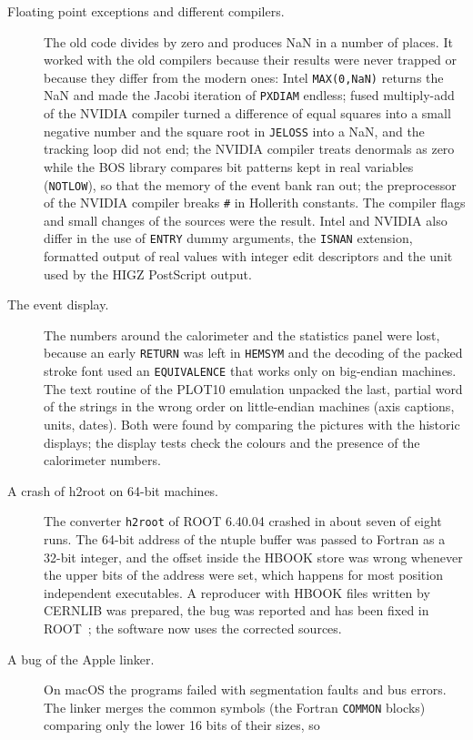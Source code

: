 \begin{description}
\item[Floating point exceptions and different compilers.] The old code divides by zero and produces NaN in a
number of places. It worked with the old compilers because their results were never trapped or because they
differ from the modern ones: Intel \texttt{MAX(0,NaN)} returns the NaN and made the Jacobi iteration of
\texttt{PXDIAM} endless; fused multiply-add of the NVIDIA compiler turned a difference of equal squares into a
small negative number and the square root in \texttt{JELOSS} into a NaN, and the tracking loop did not end; the
NVIDIA compiler treats denormals as zero while the BOS library compares bit patterns kept in real variables
(\texttt{NOTLOW}), so that the memory of the event bank ran out; the preprocessor of the NVIDIA compiler
breaks \texttt{\#} in Hollerith constants. The compiler flags and small changes of the sources were the result.
Intel and NVIDIA also differ in the use of \texttt{ENTRY} dummy arguments, the \texttt{ISNAN} extension,
formatted output of real values with integer edit descriptors and the unit used by the HIGZ PostScript output.
\item[The event display.] The numbers around the calorimeter and the statistics panel were lost, because an early
\texttt{RETURN} was left in \texttt{HEMSYM} and the decoding of the packed stroke font used an
\texttt{EQUIVALENCE} that works only on big-endian machines. The text routine of the PLOT10 emulation
unpacked the last, partial word of the strings in the wrong order on little-endian machines (axis captions,
units, dates). Both were found by comparing the pictures with the historic displays; the display tests check the
colours and the presence of the calorimeter numbers.
\item[A crash of h2root on 64-bit machines.] The converter \texttt{h2root} of ROOT 6.40.04 crashed in about seven
of eight runs. The 64-bit address of the ntuple buffer was passed to Fortran as a 32-bit integer, and the offset
inside the HBOOK store was wrong whenever the upper bits of the address were set, which happens for most
position independent executables. A reproducer with HBOOK files written by CERNLIB was prepared, the bug was
reported and has been fixed in ROOT~\cite{ROOT:hbookfix}; the software now uses the corrected sources.
\item[A bug of the Apple linker.] On macOS the programs failed with segmentation faults and bus errors. The linker
merges the common symbols (the Fortran \texttt{COMMON} blocks) comparing only the lower 16 bits of their sizes, so

\end{description}
